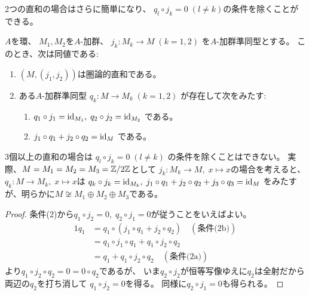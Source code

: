 \documentclass[report]{jlreq}
\begin{document}
2つの直和の場合はさらに簡単になり、
$q_l \circ j_k = 0 \; (l \neq k)$の条件を除くことができる。

\begin{corollary}
    $A$を環、
    $M_1, M_2$を$A$-加群、
    $j_k \colon M_k \to M \; (k = 1, 2)$
    を$A$-加群準同型とする。
    このとき、次は同値である:
    \begin{enumerate}
        \item $(M, (j_1, j_2))$は圏論的直和である。
        \item ある$A$-加群準同型
            $q_k \colon M \to M_k \; (k = 1, 2)$
            が存在して次をみたす:
            \begin{enumerate}
                \item $q_1 \circ j_1 = \mathrm{id}_{M_1}, \;
                    q_2 \circ j_2 = \mathrm{id}_{M_2}$
                    である。
                \item $j_1 \circ q_1 + j_2 \circ q_2 = \mathrm{id}_M$
                    である。
            \end{enumerate}
    \end{enumerate}
\end{corollary}

\begin{remark}
    3個以上の直和の場合は
    $q_l \circ j_k = 0 \; (l \neq k)$
    の条件を除くことはできない。
    実際、$M = M_1 = M_2 = M_3 = \mathbb{Z}/2\mathbb{Z}$として
    $j_k \colon M_k \to M, \; x \mapsto x$の場合を考えると、
    $q_k \colon M \to M_k, \; x \mapsto x$は
    $q_k \circ j_k = \mathrm{id}_{M_k}, \;
        j_1 \circ q_1 + j_2 \circ q_2 + j_3 \circ q_3 = \mathrm{id}_M$
    をみたすが、明らかに$M \not\cong M_1 \oplus M_2 \oplus M_3$である。
\end{remark}

\begin{proof}
    条件(2)から$q_1 \circ j_2 = 0, \; q_2 \circ j_1 = 0$が従うことをいえばよい。
    \begin{alignat}{1}
        q_1
            &= q_1 \circ (j_1 \circ q_1 + j_2 \circ q_2)
                \quad (\text{条件(2b)}) \\
            &= q_1 \circ j_1 \circ q_1 + q_1 \circ j_2 \circ q_2 \\
            &= q_1 + q_1 \circ j_2 \circ q_2
                \quad (\text{条件(2a)})
    \end{alignat}
    より$q_1 \circ j_2 \circ q_2 = 0 = 0 \circ q_2$であるが、
    いま$q_2 \circ j_2$が恒等写像ゆえに$q_2$は全射だから
    両辺の$q_2$を打ち消して
    $q_1 \circ j_2 = 0$を得る。
    同様に$q_2 \circ j_1 = 0$も得られる。
\end{proof}
\end{document}

